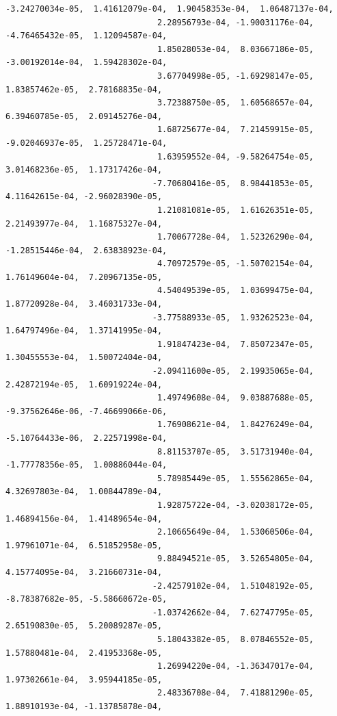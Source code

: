 \documentclass[11pt]{article}
\begin{document}
\begin{Verbatim}[commandchars=\\\{\}]
                              -3.24270034e-05,  1.41612079e-04,  1.90458353e-04,  1.06487137e-04,
                               2.28956793e-04, -1.90031176e-04, -4.76465432e-05,  1.12094587e-04,
                               1.85028053e-04,  8.03667186e-05, -3.00192014e-04,  1.59428302e-04,
                               3.67704998e-05, -1.69298147e-05,  1.83857462e-05,  2.78168835e-04,
                               3.72388750e-05,  1.60568657e-04,  6.39460785e-05,  2.09145276e-04,
                               1.68725677e-04,  7.21459915e-05, -9.02046937e-05,  1.25728471e-04,
                               1.63959552e-04, -9.58264754e-05,  3.01468236e-05,  1.17317426e-04,
                              -7.70680416e-05,  8.98441853e-05,  4.11642615e-04, -2.96028390e-05,
                               1.21081081e-05,  1.61626351e-05,  2.21493977e-04,  1.16875327e-04,
                               1.70067728e-04,  1.52326290e-04, -1.28515446e-04,  2.63838923e-04,
                               4.70972579e-05, -1.50702154e-04,  1.76149604e-04,  7.20967135e-05,
                               4.54049539e-05,  1.03699475e-04,  1.87720928e-04,  3.46031733e-04,
                              -3.77588933e-05,  1.93262523e-04,  1.64797496e-04,  1.37141995e-04,
                               1.91847423e-04,  7.85072347e-05,  1.30455553e-04,  1.50072404e-04,
                              -2.09411600e-05,  2.19935065e-04,  2.42872194e-05,  1.60919224e-04,
                               1.49749608e-04,  9.03887688e-05, -9.37562646e-06, -7.46699066e-06,
                               1.76908621e-04,  1.84276249e-04, -5.10764433e-06,  2.22571998e-04,
                               8.81153707e-05,  3.51731940e-04, -1.77778356e-05,  1.00886044e-04,
                               5.78985449e-05,  1.55562865e-04,  4.32697803e-04,  1.00844789e-04,
                               1.92875722e-04, -3.02038172e-05,  1.46894156e-04,  1.41489654e-04,
                               2.10665649e-04,  1.53060506e-04,  1.97961071e-04,  6.51852958e-05,
                               9.88494521e-05,  3.52654805e-04,  4.15774095e-04,  3.21660731e-04,
                              -2.42579102e-04,  1.51048192e-05, -8.78387682e-05, -5.58660672e-05,
                              -1.03742662e-04,  7.62747795e-05,  2.65190830e-05,  5.20089287e-05,
                               5.18043382e-05,  8.07846552e-05,  1.57880481e-04,  2.41953368e-05,
                               1.26994220e-04, -1.36347017e-04,  1.97302661e-04,  3.95944185e-05,
                               2.48336708e-04,  7.41881290e-05,  1.88910193e-04, -1.13785878e-04,

\end{Verbatim}
\end{document}
